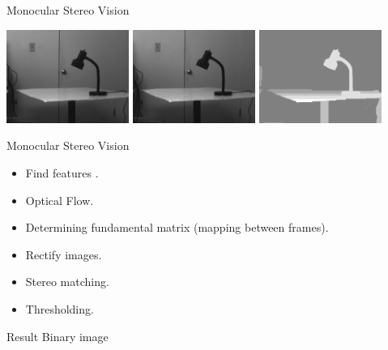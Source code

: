 \documentclass{beamer}
\begin{document}
\begin{frame}
\begin{block}{Monocular Stereo Vision}
\begin{center}
\includegraphics[width=0.3\textwidth]{images/lamp_left.jpg}
\includegraphics[width=0.3\textwidth]{images/lamp_right.jpg}
\includegraphics[width=0.3\textwidth]{images/lamp_disparity.jpg}
\end{center}
\end{block}
\end{frame}


\begin{frame}
\begin{block}{Monocular Stereo Vision}
\begin{itemize}
\item Find features \cite{Shi1994}.
\item Optical Flow.
\item Determining fundamental matrix (mapping between frames).
\item Rectify images.
\item Stereo matching.
\item Thresholding.
\end{itemize}
\end{block}
\begin{block}{Result}
Binary image
\end{block}
\end{frame}
\end{document}
